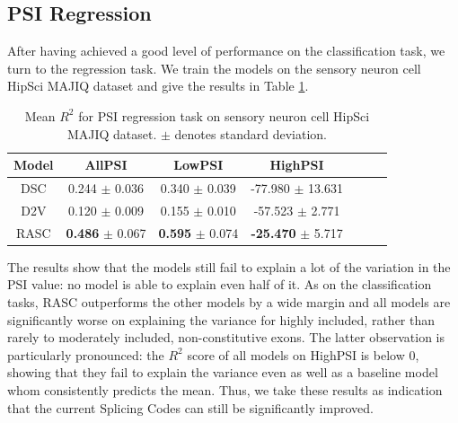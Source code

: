 \subsection{PSI Regression} \label{subsubsec:psi_regression}
After having achieved a good level of performance on the classification task, we turn to the regression task. We train the models on the sensory neuron cell HipSci MAJIQ dataset and give the results in Table \ref{table:psi_regression}. 


\begin{table}
	\centering
	\begin{tabular}{ c c c c c c c} 
		\hline
		Model & AllPSI &  LowPSI &  HighPSI \\
		\hline
		DSC	&	0.244   $\pm$	0.036	&	0.340	$\pm$	0.039	&	-77.980	$\pm$	13.631\\
		D2V	&	0.120	$\pm$	0.009	&	0.155	$\pm$	0.010	&	-57.523	$\pm$	2.771\\
		RASC	&	\textbf{0.486}	$\pm$	0.067	&	\textbf{0.595}	$\pm$	0.074	&	\textbf{-25.470}	$\pm$	5.717\\
		\hline
	\end{tabular}
	\caption{Mean $R^2$ for PSI regression task on sensory neuron cell HipSci MAJIQ dataset.  $\pm$ denotes standard deviation. 
	}
	\label{table:psi_regression}
\end{table}


The results show that the models still fail to explain a lot of the variation in the PSI value: no model is able to explain even half of it. 
As on the classification tasks, RASC outperforms the other models by a wide margin and all models are significantly worse on explaining the variance for highly included, rather than rarely to moderately included, non-constitutive exons. The latter observation is particularly pronounced: the $R^2$ score of all models on HighPSI is below 0, showing that they fail to explain the variance even as well as a baseline model whom consistently predicts the mean. Thus, we take these results as indication that the current Splicing Codes can still be significantly improved. 




